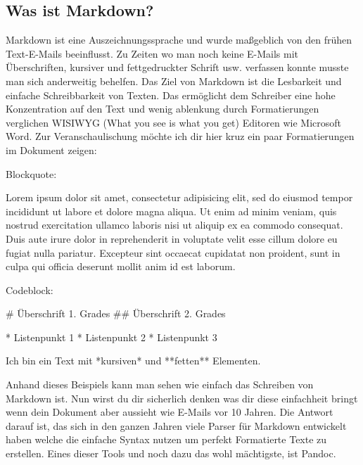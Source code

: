\documentclass[
    12pt,
    a4paper,
            ngerman,
        bibliography=totocnumbered,
    listof=totocnumbered
]{scrartcl}
\renewenvironment{quote}{\begin{customblockquote}\list{}{\rightmargin=0em\leftmargin=0em}%
\item\relax\color{blockquote-text}\ignorespaces}{\unskip\unskip\endlist\end{customblockquote}}
\newenvironment{Shaded}{}{}
\newcommand{\FunctionTok}[1]{\textcolor[rgb]{0.02,0.16,0.49}{#1}}
\newcommand{\NormalTok}[1]{#1}
\newcommand{\SpecialStringTok}[1]{\textcolor[rgb]{0.73,0.40,0.53}{#1}}
\begin{document}
\hypertarget{was-ist-markdown}{%
\subsection{Was ist Markdown?}\label{was-ist-markdown}}

Markdown ist eine Auszeichnungssprache und wurde maßgeblich von den
frühen Text-E-Mails beeinflusst. Zu Zeiten wo man noch keine E-Mails mit
Überschriften, kursiver und fettgedruckter Schrift usw. verfassen konnte
musste man sich anderweitig behelfen. Das Ziel von Markdown ist die
Lesbarkeit und einfache Schreibbarkeit von Texten. Das ermöglicht dem
Schreiber eine hohe Konzentration auf den Text und wenig ablenkung durch
Formatierungen verglichen WISIWYG (What you see is what you get)
Editoren wie Microsoft Word. Zur Veranschaulischung möchte ich dir hier
kruz ein paar Formatierungen im Dokument zeigen:

Blockquote:

\begin{quote}
Lorem ipsum dolor sit amet, consectetur adipisicing elit, sed do eiusmod
tempor incididunt ut labore et dolore magna aliqua. Ut enim ad minim
veniam, quis nostrud exercitation ullamco laboris nisi ut aliquip ex ea
commodo consequat. Duis aute irure dolor in reprehenderit in voluptate
velit esse cillum dolore eu fugiat nulla pariatur. Excepteur sint
occaecat cupidatat non proident, sunt in culpa qui officia deserunt
mollit anim id est laborum.
\end{quote}

Codeblock:

\begin{Shaded}
\begin{Highlighting}[]
\FunctionTok{\# Überschrift 1. Grades}
\FunctionTok{\#\# Überschrift 2. Grades}

\SpecialStringTok{* }\NormalTok{Listenpunkt 1}
\SpecialStringTok{* }\NormalTok{Listenpunkt 2}
\SpecialStringTok{* }\NormalTok{Listenpunkt 3}

\NormalTok{Ich bin ein Text mit *kursiven* und **fetten** Elementen.}
\end{Highlighting}
\end{Shaded}

Anhand dieses Beispiels kann man sehen wie einfach das Schreiben von
Markdown ist. Nun wirst du dir sicherlich denken was dir diese
einfachheit bringt wenn dein Dokument aber aussieht wie E-Mails vor 10
Jahren. Die Antwort darauf ist, das sich in den ganzen Jahren viele
Parser für Markdown entwickelt haben welche die einfache Syntax nutzen
um perfekt Formatierte Texte zu erstellen. Eines dieser Tools und noch
dazu das wohl mächtigste, ist Pandoc.
\end{document}

